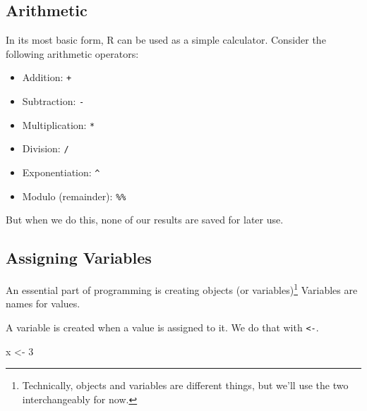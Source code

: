 \documentclass[]{book}
\newenvironment{Shaded}{\begin{snugshade}}{\end{snugshade}}
\newcommand{\DecValTok}[1]{\textcolor[rgb]{0.00,0.00,0.81}{#1}}
\newcommand{\StringTok}[1]{\textcolor[rgb]{0.31,0.60,0.02}{#1}}
\newcommand{\CommentTok}[1]{\textcolor[rgb]{0.56,0.35,0.01}{\textit{#1}}}
\newcommand{\OperatorTok}[1]{\textcolor[rgb]{0.81,0.36,0.00}{\textbf{#1}}}
\newcommand{\NormalTok}[1]{#1}
\providecommand{\tightlist}{%
  \setlength{\itemsep}{0pt}\setlength{\parskip}{0pt}}
\let\rmarkdownfootnote\footnote%
\def\footnote{\protect\rmarkdownfootnote}
\begin{document}
\subsection{Arithmetic}\label{arithmetic}

In its most basic form, R can be used as a simple calculator. Consider
the following arithmetic operators:

\begin{itemize}
\tightlist
\item
  Addition: \texttt{+}
\item
  Subtraction: \texttt{-}
\item
  Multiplication: \texttt{*}
\item
  Division: \texttt{/}
\item
  Exponentiation: \texttt{\^{}}
\item
  Modulo (remainder): \texttt{\%\%}
\end{itemize}

\begin{Shaded}
\end{Shaded}

But when we do this, none of our results are saved for later use.

\subsection{Assigning Variables}\label{assigning-variables}

An essential part of programming is creating objects (or
variables)\footnote{Technically, objects and variables are different
  things, but we'll use the two interchangeably for now.} Variables are
names for values.

A variable is created when a value is assigned to it. We do that with
\texttt{\textless{}-}.

\begin{Shaded}
\begin{Highlighting}[]
\NormalTok{x <-}\StringTok{ }\DecValTok{3}
\end{Highlighting}
\end{Shaded}
\end{document}
